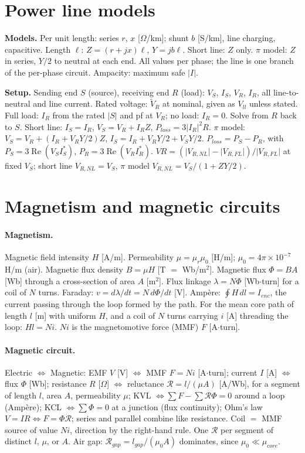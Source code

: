 \documentclass{article}
\newcommand{\abs}[1]{\lvert#1\rvert}
\begin{document}
\section{Power line models}
\textbf{Models.}
Per unit length: series $r$, $x$ [$\Omega$/km]; shunt $b$ [S/km], line charging, capacitive.
Length $\ell$: $Z = (r + jx)\ell$, $Y = jb\ell$.
Short line: $Z$ only.
$\pi$ model: $Z$ in series, $Y/2$ to neutral at each end.
All values per phase; the line is one branch of the per-phase circuit.
Ampacity: maximum safe $\abs{I}$.

\textbf{Setup.}
Sending end $S$ (source), receiving end $R$ (load): $V_S$, $I_S$, $V_R$, $I_R$, all line-to-neutral and line current.
Rated voltage: $\tilde V_R$ at nominal, given as $V_{ll}$ unless stated.
Full load: $I_R$ from the rated $\abs{S}$ and pf at $V_R$; no load: $I_R = 0$.
Solve from $R$ back to $S$.
Short line: $I_S = I_R$, $V_S = V_R + I_R Z$, $P_{loss} = 3\abs{I_R}^2 R$.
$\pi$ model: $V_S = V_R + (I_R + V_R Y/2)Z$, $I_S = I_R + V_R Y/2 + V_S Y/2$.
$P_{loss} = P_S - P_R$, with $P_S = 3\operatorname{Re}(V_S I_S^*)$, $P_R = 3\operatorname{Re}(V_R I_R^*)$.
$VR = (\abs{V_{R,NL}} - \abs{V_{R,FL}})/\abs{V_{R,FL}}$ at fixed $V_S$; short line $V_{R,NL} = V_S$, $\pi$ model $V_{R,NL} = V_S/(1 + ZY/2)$.




\section{Magnetism and magnetic circuits}

\paragraph{Magnetism.}
Magnetic field intensity $H$ [A/m].
Permeability $\mu = \mu_r\mu_0$ [H/m]; $\mu_0 = 4\pi\times10^{-7}$ H/m (air).
Magnetic flux density $B = \mu H$ [T $=$ Wb/m$^2$].
Magnetic flux $\Phi = BA$ [Wb] through a cross-section of area $A$ [m$^2$].
Flux linkage $\lambda = N\Phi$ [Wb$\cdot$turn] for a coil of $N$ turns.
Faraday: $v = d\lambda/dt = N\,d\Phi/dt$ [V].
Ampère: $\oint H\,dl = I_{enc}$, the current passing through the loop formed by the path.
For the mean core path of length $l$ [m] with uniform $H$, and a coil of $N$ turns carrying $i$ [A] threading the loop: $Hl = Ni$.
$Ni$ is the magnetomotive force (MMF) $F$ [A$\cdot$turn].

\paragraph{Magnetic circuit.}
Electric $\iff$ Magnetic:
EMF $V$ [V] $\iff$ MMF $F = Ni$ [A$\cdot$turn];
current $I$ [A] $\iff$ flux $\Phi$ [Wb];
resistance $R$ [$\Omega$] $\iff$ reluctance $\mathcal R = l/(\mu A)$ [A/Wb], for a segment of length $l$, area $A$, permeability $\mu$;
KVL $\iff \sum F - \sum\mathcal R\Phi = 0$ around a loop (Ampère);
KCL $\iff \sum\Phi = 0$ at a junction (flux continuity);
Ohm's law $V = IR \iff F = \Phi\mathcal R$; series and parallel combine like resistance.
Coil $=$ MMF source of value $Ni$, direction by the right-hand rule.
One $\mathcal R$ per segment of distinct $l$, $\mu$, or $A$.
Air gap: $\mathcal R_{gap} = l_{gap}/(\mu_0 A)$ dominates, since $\mu_0 \ll \mu_{core}$.
\end{document}
